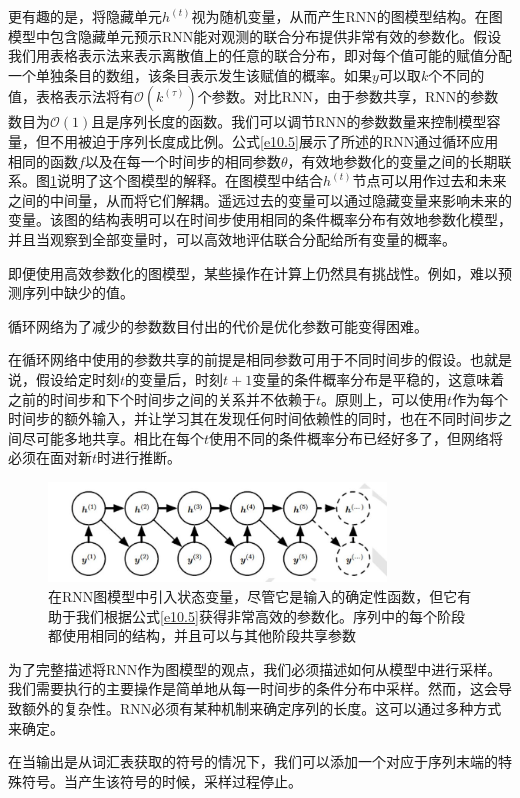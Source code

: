 \documentclass{ctexart}
\begin{document}
            更有趣的是，将隐藏单元$h^{(t)}$视为随机变量，从而产生RNN的图模型结构。在图模型中包含隐藏单元预示RNN能对观测的联合分布提供非常有效的参数化。假设我们用表格表示法来表示离散值上的任意的联合分布，即对每个值可能的赋值分配一个单独条目的数组，该条目表示发生该赋值的概率。如果$y$可以取$k$个不同的值，表格表示法将有$\mathcal{O}(k^{(\tau)})$个参数。对比RNN，由于参数共享，RNN的参数数目为$\mathcal{O}(1)$且是序列长度的函数。我们可以调节RNN的参数数量来控制模型容量，但不用被迫于序列长度成比例。公式\ref{e10.5}展示了所述的RNN通过循环应用相同的函数$f$以及在每一个时间步的相同参数$\theta$，有效地参数化的变量之间的长期联系。图\ref{f10.8}说明了这个图模型的解释。在图模型中结合$h^{(t)}$节点可以用作过去和未来之间的中间量，从而将它们解耦。遥远过去的变量可以通过隐藏变量来影响未来的变量。该图的结构表明可以在时间步使用相同的条件概率分布有效地参数化模型，并且当观察到全部变量时，可以高效地评估联合分配给所有变量的概率。

            即便使用高效参数化的图模型，某些操作在计算上仍然具有挑战性。例如，难以预测序列中缺少的值。

            循环网络为了减少的参数数目付出的代价是优化参数可能变得困难。

            在循环网络中使用的参数共享的前提是相同参数可用于不同时间步的假设。也就是说，假设给定时刻$t$的变量后，时刻$t+1$变量的条件概率分布是平稳的，这意味着之前的时间步和下个时间步之间的关系并不依赖于$t$。原则上，可以使用$t$作为每个时间步的额外输入，并让学习其在发现任何时间依赖性的同时，也在不同时间步之间尽可能多地共享。相比在每个$t$使用不同的条件概率分布已经好多了，但网络将必须在面对新$t$时进行推断。
            \begin{figure}[h]
                \centering
                \includegraphics[width=0.8\textwidth]{f8}
                \caption{在RNN图模型中引入状态变量，尽管它是输入的确定性函数，但它有助于我们根据公式\ref{e10.5}获得非常高效的参数化。序列中的每个阶段都使用相同的结构，并且可以与其他阶段共享参数}
                \label{f10.8}
            \end{figure}
            为了完整描述将RNN作为图模型的观点，我们必须描述如何从模型中进行采样。我们需要执行的主要操作是简单地从每一时间步的条件分布中采样。然而，这会导致额外的复杂性。RNN必须有某种机制来确定序列的长度。这可以通过多种方式来确定。
            
            在当输出是从词汇表获取的符号的情况下，我们可以添加一个对应于序列末端的特殊符号。当产生该符号的时候，采样过程停止。
\end{document}
